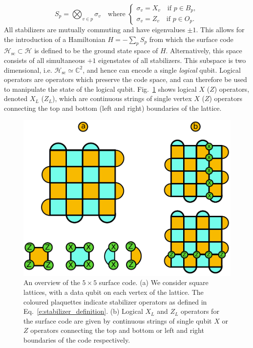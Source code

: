 \documentclass[twocolumn,preprintnumbers,amsmath,amssymb,notitlepage,nofootinbib,longbibliography,superscriptaddress,aps,pra,10pt]{revtex4-1}
\begin{document}
	\begin{equation}\label{e:stabilizer_definition}
		S_p = \bigotimes_{v\in p} \sigma_v \quad \text{where }
		\begin{cases}
			\sigma_v = X_v \quad \text{if } p \in B_p,\\
			\sigma_v = Z_v \quad \text{if } p \in O_p.
		\end{cases}
	\end{equation}
	All stabilizers are mutually commuting and have eigenvalues $\pm 1$.
	This allows for the introduction of a  Hamiltonian $H = -\sum_p S_p$ from which the surface code $\mathcal{H}_\mathrm{sc} \subset \mathcal{H}$ is defined to be the ground state space of $H$.
	Alternatively, this space consists of all simultaneous $+1$ eigenstates of all stabilizers.
	This subspace is two dimensional, i.e. $\mathcal{H}_\mathrm{sc} \simeq \mathbb{C}^2$, and hence can encode a single \textit{logical} qubit.
	Logical operators are operators which preserve the code space, and can therefore be used to manipulate the state of the logical qubit.
	Fig.~\ref{f:surface_code} shows logical $X$ ($Z$) operators, denoted $X_L$ ($Z_L$), which are continuous strings of single vertex $X$ ($Z$) operators connecting the top and bottom (left and right) boundaries of the lattice.

	\begin{figure}
		\centering
		\includegraphics[width=0.8\linewidth]{figures/surface_code.pdf}
		\caption{
			An overview of the $5 \times 5$ surface code.
			(a) We consider square lattices, with a data qubit on each vertex of the lattice.
			The coloured plaquettes indicate stabilizer operators as defined in Eq.~\eqref{e:stabilizer_definition}.
			(b) Logical $X_L$ and $Z_L$ operators for the surface code are given by continuous strings of single qubit $X$ or $Z$ operators connecting the top and bottom or left and right boundaries of the code respectively.
		}
		\label{f:surface_code}
	\end{figure}
\end{document}
